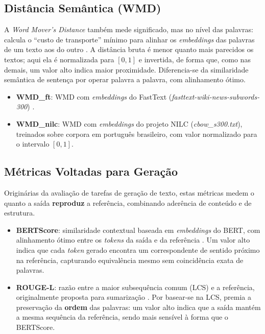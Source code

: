 \subsection{Distância Semântica (WMD)}

A \textit{Word Mover's Distance} também mede significado, mas no nível das palavras: calcula o ``custo de transporte'' mínimo para alinhar os \textit{embeddings} das palavras de um texto aos do outro \cite{kusner2015}. A distância bruta é menor quanto mais parecidos os textos; aqui ela é normalizada para $[0,1]$ e invertida, de forma que, como nas demais, um valor alto indica maior proximidade. Diferencia-se da similaridade semântica de sentença por operar palavra a palavra, com alinhamento ótimo.

\begin{itemize}
    \item \textbf{WMD\_ft}: WMD com \textit{embeddings} do FastText (\textit{fasttext-wiki-news-subwords-300}) \cite{bojanowski2017}.
    \item \textbf{WMD\_nilc}: WMD com \textit{embeddings} do projeto NILC (\textit{cbow\_s300.txt}), treinados sobre corpora em português brasileiro, com valor normalizado para o intervalo $[0,1]$.
\end{itemize}

\subsection{Métricas Voltadas para Geração}

Originárias da avaliação de tarefas de geração de texto, estas métricas medem o quanto a saída \textbf{reproduz} a referência, combinando aderência de conteúdo e de estrutura.

\begin{itemize}
    \item \textbf{BERTScore}: similaridade contextual baseada em \textit{embeddings} do BERT, com alinhamento ótimo entre os \textit{tokens} da saída e da referência \cite{zhang2020bertscore}. Um valor alto indica que cada \textit{token} gerado encontra um correspondente de sentido próximo na referência, capturando equivalência mesmo sem coincidência exata de palavras.
    \item \textbf{ROUGE-L}: razão entre a maior subsequência comum (LCS) e a referência, originalmente proposta para sumarização \cite{lin2004rouge}. Por basear-se na LCS, premia a preservação da \textbf{ordem} das palavras: um valor alto indica que a saída mantém a mesma sequência da referência, sendo mais sensível à forma que o BERTScore.
\end{itemize}

